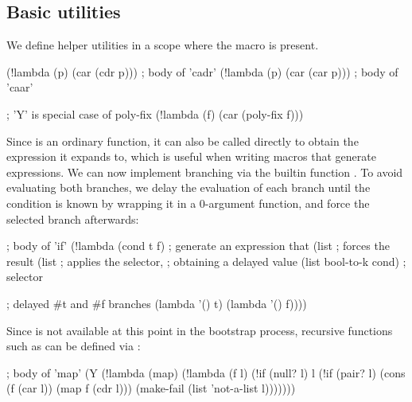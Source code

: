 \subsection{Basic utilities}
We define helper utilities in a scope where the  macro is present.
\begin{listingbox}\begin{ildcode}
(!lambda (p) (car (cdr p))) ; body of 'cadr'
(!lambda (p) (car (car p))) ; body of 'caar'

; 'Y' is special case of poly-fix
(!lambda (f) (car (poly-fix f)))
\end{ildcode}\end{listingbox}
Since  is an ordinary function, it can also be called directly
to obtain the expression it expands to, which is useful when writing macros
that generate  expressions.
We can now implement branching via the builtin function
.
To avoid evaluating both branches, we delay the evaluation of
each branch until the condition is known by wrapping it in a 0-argument
function, and force the selected branch afterwards:
\begin{listingbox}\begin{ildcode}
; body of 'if'
(!lambda (cond t f)
  ; generate an expression that
  (list     ; forces the result
    (list   ; applies the selector,
            ; obtaining a delayed value
      (list bool-to-k cond) ; selector

      ; delayed #t and #f branches
      (lambda '() t)
      (lambda '() f))))
\end{ildcode}\end{listingbox}
\label{if}
Since  is not available at this point in the bootstrap process,
recursive functions such as  can be defined via :
\begin{listingbox}\begin{ildcode}
; body of 'map'
(Y (!lambda (map)
  (!lambda (f l)
    (!if (null? l)
      l
      (!if (pair? l)
        (cons
          (f (car l)) (map f (cdr l)))
        (make-fail
          (list 'not-a-list l)))))))
\end{ildcode}\end{listingbox}
\label{def-map}

